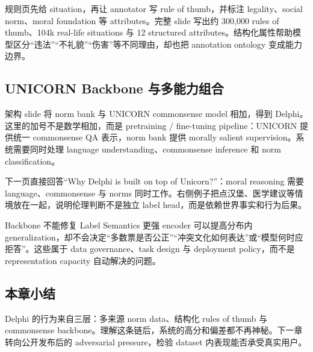 规则页先给 situation，再让 annotator 写 rule of thumb，并标注 legality、social norm、moral foundation 等 attributes。完整 slide 写出约 300,000 rules of thumb、104k real-life situations 与 12 structured attributes。结构化属性帮助模型区分“违法”“不礼貌”“伤害”等不同理由，却也把 annotation ontology 变成能力边界。


\subsection{UNICORN Backbone 与多能力组合}

架构 slide 将 norm bank 与 UNICORN commonsense model 相加，得到 Delphi。这里的加号不是数学相加，而是 pretraining / fine-tuning pipeline：UNICORN 提供统一 commonsense QA 表示，norm bank 提供 morally salient supervision。系统需要同时处理 language understanding、commonsense inference 和 norm classification。


下一页直接回答“Why Delphi is built on top of Unicorn?”：moral reasoning 需要 language、commonsense 与 norms 同时工作。右侧例子把点汉堡、医学建议等情境放在一起，说明伦理判断不是独立 label head，而是依赖世界事实和行为后果。


\begin{warningbox}{Backbone 不能修复 Label Semantics}
更强 encoder 可以提高分布内 generalization，却不会决定“多数票是否公正”“冲突文化如何表达”或“模型何时应拒答”。这些属于 data governance、task design 与 deployment policy，而不是 representation capacity 自动解决的问题。
\end{warningbox}

\subsection{本章小结}

Delphi 的行为来自三层：多来源 norm data、结构化 rules of thumb 与 commonsense backbone。理解这条链后，系统的高分和偏差都不再神秘。下一章转向公开发布后的 adversarial pressure，检验 dataset 内表现能否承受真实用户。

